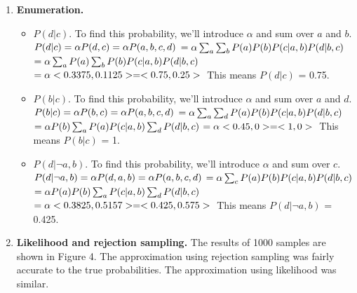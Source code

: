\documentclass[12pt]{article}
\begin{document}
\begin{enumerate}[label=(\alph*)]
    \item \textbf{Enumeration.}
        \begin{itemize}
            \item $P(d|c)$. To find this probability, we'll introduce $\alpha$ and sum over $a$ and $b$.
            $\\ P(d|c) = \alpha P(d,c) = \alpha P(a,b,c,d)\\$
            $= \alpha \sum_a \sum_b P(a) P(b) P(c|a,b) P(d|b,c)\\$
            $= \alpha \sum_a P(a) \sum_b P(b) P(c|a,b) P(d|b,c)\\$
            $= \alpha <0.3375, 0.1125> = <0.75, 0.25>\\$
            This means $P(d|c)$ = 0.75.
            \item $P(b|c)$. To find this probability, we'll introduce $\alpha$ and sum over $a$ and $d$.
            $\\ P(b|c) = \alpha P(b,c) = \alpha P(a,b,c,d)\\$
            $= \alpha \sum_a \sum_d P(a) P(b) P(c|a,b) P(d|b,c)\\$
            $= \alpha P(b) \sum_a P(a) P(c|a,b) \sum_d  P(d|b,c)\\$
            $= \alpha <0.45, 0> = <1, 0>\\$
            This means $P(b|c)$ = 1.
            \item $P(d|\neg a,b)$. To find this probability, we'll introduce $\alpha$ and sum over $c$.
            $\\ P(d|\neg a, b) = \alpha P(d,a,b) = \alpha P(a,b,c,d)\\$
            $= \alpha \sum_c P(a) P(b) P(c|a,b) P(d|b,c)\\$
            $= \alpha P(a) P(b) \sum_a P(c|a,b) \sum_d  P(d|b,c)\\$
            $= \alpha <0.3825, 0.5157> = <0.425, 0.575>\\$
            This means $P(d|\neg a, b)$ = 0.425.
        \end{itemize}
    \item \textbf{Likelihood and rejection sampling.} The results of 1000 samples are shown in Figure 4. The approximation using rejection sampling was fairly accurate to the true probabilities. The approximation using likelihood was similar.
    \begin{figure}
          \begin{subfigure}{0.5\textwidth}

\end{subfigure}
\end{figure}
\end{enumerate}
\end{document}
